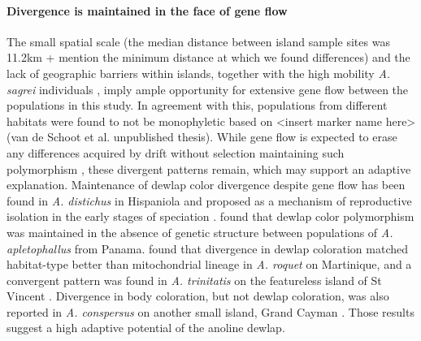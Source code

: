 
\paragraph{Divergence is maintained in the face of gene flow} The small spatial scale (the median distance between island sample sites was 11.2km + mention the minimum distance at which we found differences) and the lack of geographic barriers within islands, together with the high mobility \textit{A. sagrei} individuals \citep{Kamath2018}, imply ample opportunity for extensive gene flow between the populations in this study. In agreement with this, populations from different habitats were found to not be monophyletic based on <insert marker name here> (van de Schoot et al. unpublished thesis). While gene flow is expected to erase any differences acquired by drift without selection maintaining such polymorphism \citep{Dieckmann1999}, these divergent patterns remain, which may support an adaptive explanation. Maintenance of dewlap color divergence despite gene flow has been found in \textit{A. distichus} in Hispaniola \citep{Ng2012, Ng2016} and proposed as a mechanism of reproductive isolation in the early stages of speciation \citep{Ng2011, Lambert2013, Ng2017}. \citet{Stapley2011} found that dewlap color polymorphism was maintained in the absence of genetic structure between populations of \textit{A. apletophallus} from Panama. \citet{Thorpe2002a} found that divergence in dewlap coloration matched habitat-type better than mitochondrial lineage in \textit{A. roquet} on Martinique, and a convergent pattern was found in \textit{A. trinitatis} on the featureless island of St Vincent \citep{Thorpe2002b}. Divergence in body coloration, but not dewlap coloration, was also reported in \textit{A. conspersus} on another small island, Grand Cayman \citep{Macedonia2001}. Those results suggest a high adaptive potential of the anoline dewlap.


